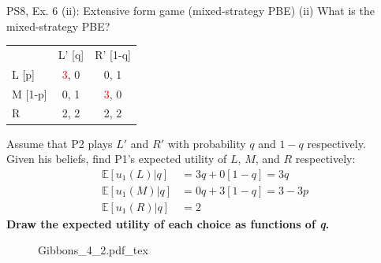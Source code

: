\begin{frame}{PS8, Ex. 6 (ii): Extensive form game (mixed-strategy PBE)}
    (ii) What is the mixed-strategy PBE? \vspace{-8pt}
    \begin{multicols}{2}
      \begin{table}
        \begin{tabular}{l|c|c|}
          \multicolumn{1}{c}{} & \multicolumn{1}{c}{L' [q]} & \multicolumn{1}{c}{R' [1-q]} \\\cline{2-3}
          L [p]   & \textcolor{red}{3}, 0 & 0, \color{blue}1 \\\cline{2-3}
          M [1-p] & 0, \color{blue}1 & \textcolor{red}{3}, 0 \\\cline{2-3}
          R       & 2, \color{blue}2 & 2, \color{blue}2 \\\cline{2-3}
        \end{tabular}
      \end{table} \vspace{-4pt}
      Assume that P2 plays $L'$ and $R'$ with probability $q$ and $1-q$ respectively.\\\smallskip
      Given his beliefs, find P1's expected utility of $L$, $M$, and $R$ respectively: \vspace{-4pt}
      \begin{align*}
        \mathbb{E}[u_1(L)|q]&=3q+0[1-q]=3q\\
        \mathbb{E}[u_1(M)|q]&=0q+3[1-q]=3-3p\\
        \mathbb{E}[u_1(R)|q]&=2
      \end{align*}
      \textbf{Draw the expected utility of each choice as functions of \textit{q}.}
      \vfill\null\columnbreak
      \begin{figure}[!h]
        \center {}
        {Gibbons_4_2.pdf_tex}
      \end{figure}
      \vfill\null
    \end{multicols}
\end{frame}
